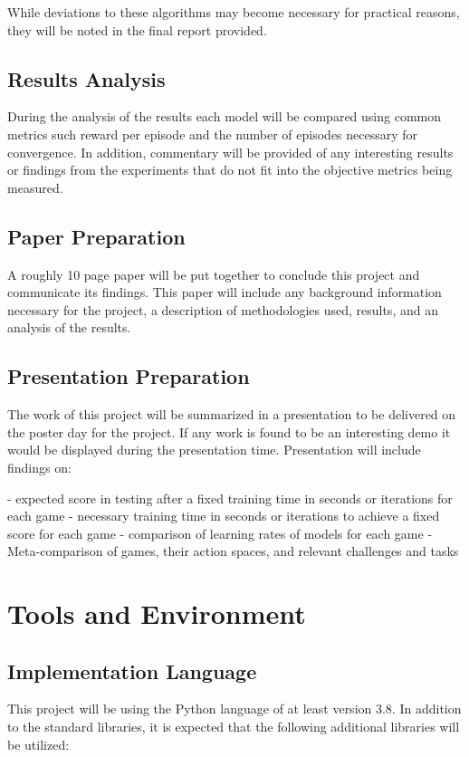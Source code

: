 \documentclass[conference]{IEEEtran}
\begin{document}
While deviations to these algorithms may become necessary for practical reasons, they will be noted in the final report provided.

\subsection{Results Analysis}
During the analysis of the results each model will be compared using common metrics such reward per episode and the number of episodes necessary for convergence.
In addition, commentary will be provided of any interesting results or findings from the experiments that do not fit into the objective metrics being measured.

\subsection{Paper Preparation}
A roughly 10 page paper will be put together to conclude this project and communicate its findings.
This paper will include any background information necessary for the project, a description of methodologies used, results, and an analysis of the results.

\subsection{Presentation Preparation}
The work of this project will be summarized in a presentation to be delivered on the poster day for the project.
If any work is found to be an interesting demo it would be displayed during the presentation time. Presentation will include findings on:
\begin{enumerate}
- expected score in testing after a fixed training time in seconds or iterations for each game
- necessary training time in seconds or iterations to achieve a fixed score for each game
- comparison of learning rates of models for each game
- Meta-comparison of games, their action spaces, and relevant challenges and tasks
\end{enumerate}

\section{Tools and Environment}

\subsection{Implementation Language}
This project will be using the Python language of at least version 3.8.
In addition to the standard libraries, it is expected that the following additional libraries will be utilized:
\end{document}
